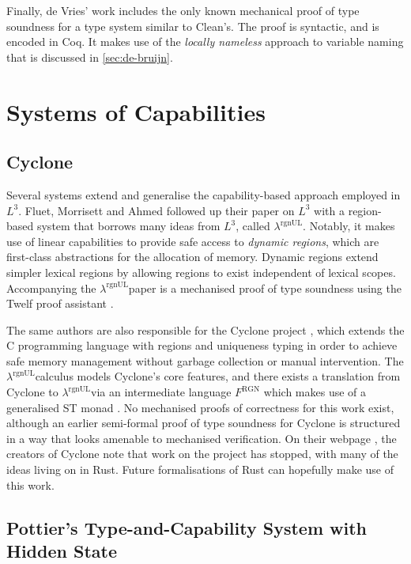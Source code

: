 \documentclass[]{unswthesis}
\newcommand{\rgnUL}{$\lambda^\text{rgnUL}$\text{ }}
\let\i\textit
\begin{document}
Finally, de Vries' work includes the only known mechanical proof of type soundness for a type system similar to Clean's. The proof is syntactic, and is encoded in Coq. It makes use of the \i{locally nameless} approach to variable naming that is discussed in \cref{sec:de-bruijn}.

\section{Systems of Capabilities}

\subsection{Cyclone}

Several systems extend and generalise the capability-based approach employed in $L^3$. Fluet, Morrisett and Ahmed followed up their paper on $L^3$ with a region-based system that borrows many ideas from $L^3$, called \rgnUL \cite{fluet06}. Notably, it makes use of linear capabilities to provide safe access to \i{dynamic regions}, which are first-class abstractions for the allocation of memory. Dynamic regions extend simpler lexical regions by allowing regions to exist independent of lexical scopes. Accompanying the \rgnUL paper is a mechanised proof of type soundness using the Twelf proof assistant \cite{pfenning99}.

The same authors are also responsible for the Cyclone project \cite{grossman05}, which extends the C programming language with regions and uniqueness typing in order to achieve safe memory management without garbage collection or manual intervention. The \rgnUL calculus models Cyclone's core features, and there exists a translation from Cyclone to \rgnUL via an intermediate language $F^\text{RGN}$ which makes use of a generalised ST monad \cite{fluet06, fluet04}. No mechanised proofs of correctness for this work exist, although an earlier semi-formal proof of type soundness for Cyclone \cite{jim01} is structured in a way that looks amenable to mechanised verification. On their webpage \cite{cycloneWeb}, the creators of Cyclone note that work on the project has stopped, with many of the ideas living on in Rust. Future formalisations of Rust can hopefully make use of this work.

\subsection{Pottier's Type-and-Capability System with Hidden State}
\label{sec:ssphs}
\end{document}
